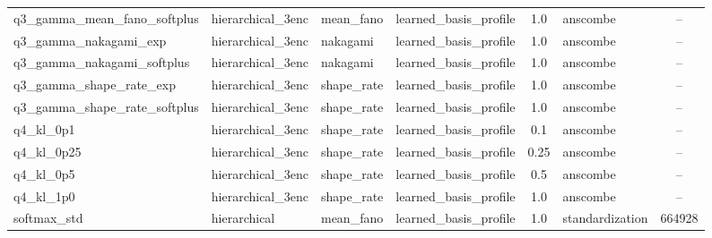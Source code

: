\begin{table}[htbp]
\begin{tabular}{@{}l l l l S[table-format=1.2] l S[table-format=6.0]@{}}
{q3\_gamma\_mean\_fano\_softplus} & {hierarchical\_3enc} & {mean\_fano} & {learned\_basis\_profile} & 1.0 & {anscombe} & {--} \\
{q3\_gamma\_nakagami\_exp} & {hierarchical\_3enc} & {nakagami} & {learned\_basis\_profile} & 1.0 & {anscombe} & {--} \\
{q3\_gamma\_nakagami\_softplus} & {hierarchical\_3enc} & {nakagami} & {learned\_basis\_profile} & 1.0 & {anscombe} & {--} \\
{q3\_gamma\_shape\_rate\_exp} & {hierarchical\_3enc} & {shape\_rate} & {learned\_basis\_profile} & 1.0 & {anscombe} & {--} \\
{q3\_gamma\_shape\_rate\_softplus} & {hierarchical\_3enc} & {shape\_rate} & {learned\_basis\_profile} & 1.0 & {anscombe} & {--} \\
{q4\_kl\_0p1} & {hierarchical\_3enc} & {shape\_rate} & {learned\_basis\_profile} & 0.1 & {anscombe} & {--} \\
{q4\_kl\_0p25} & {hierarchical\_3enc} & {shape\_rate} & {learned\_basis\_profile} & 0.25 & {anscombe} & {--} \\
{q4\_kl\_0p5} & {hierarchical\_3enc} & {shape\_rate} & {learned\_basis\_profile} & 0.5 & {anscombe} & {--} \\
{q4\_kl\_1p0} & {hierarchical\_3enc} & {shape\_rate} & {learned\_basis\_profile} & 1.0 & {anscombe} & {--} \\
{softmax\_std} & {hierarchical} & {mean\_fano} & {learned\_basis\_profile} & 1.0 & {standardization} & 664928 \\
\bottomrule
\end{tabular}
\end{table}
